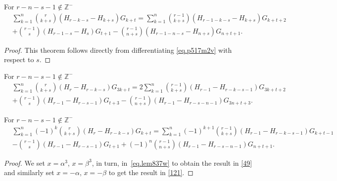 \documentclass[12pt,reqno]{article}
\begin{document}
	\begin{theorem}
	For $r-n-s-1\notin \mathbb{Z}^{-}$
	\begin{equation}
	\begin{split}
	&\sum_{k = 1}^n\binom{r}{k+s}\left(H_{r-k-s}-H_{k+s}\right)G_{k+t}=\sum_{k=1}^n\binom{r-1}{k+s}\left(H_{r-1-k-s}-H_{k+s}\right)G_{k+t+2}\\
	&                 +\binom{r-1}{s}\left(H_{r-1-s}-H_s\right)G_{t+1}-\binom{r-1}{n+s}\left(H_{r-1-n-s}-H_{n+s}\right)G_{n+t+1}.
	\end{split}
	\end{equation}
	\end{theorem}
	\begin{proof}
		This theorem follows directly from differentiating \eqref{eq.p517m2v} with respect to $s$.
	\end{proof}
	\begin{theorem}
		For  $r-n-s-1\notin \mathbb{Z}^{-}$
		\begin{equation}
			\label{49}
			\begin{split}
				&\sum_{k = 1}^n\binom{r}{k+s}\left(H_{r}-H_{r-k-s}\right)G_{3k+t}
				=2\sum_{k=1}^n\binom{r-1}{k+s}\left(H_{r-1}-H_{r-k-s-1}\right)G_{3k+t+2}\\
				&+\binom{r-1}{s}\left(H_{r-1}-H_{r-s-1}\right)G_{t+3}-\binom{r-1}{n+s}\left(H_{r-1}-H_{r-s-n-1}\right)G_{3n+t+3}.
			\end{split}
		\end{equation}
		
	\end{theorem}
	\begin{theorem}
		For  $r-n-s-1\notin \mathbb{Z}^{-}$
		\begin{equation}
			\label{121}
			\begin{split}
				&\sum_{k = 1}^n(-1)^k\binom{r}{k+s}\left(H_{r}-H_{r-k-s}\right)G_{k+t}
				=\sum_{k=1}^n(-1)^{k+1}\binom{r-1}{k+s}\left(H_{r-1}-H_{r-k-s-1}\right)G_{k+t-1}\\
				&-\binom{r-1}{s}\left(H_{r-1}-H_{r-s-1}\right)G_{t+1}+(-1)^n\binom{r-1}{n+s}\left(H_{r-1}-H_{r-s-n-1}\right)G_{n+t+1}.
			\end{split}
		\end{equation}
	\end{theorem}
	\begin{proof}
		We set  $x=\alpha^3$, $x=\beta^3$, in turn, in~\eqref{eq.lem837w} to obtain the result in \eqref{49} and similarly set $x=-\alpha$, 
		$x=-\beta$ to get the result in \eqref{121}.
	\end{proof}
	
\end{document}
